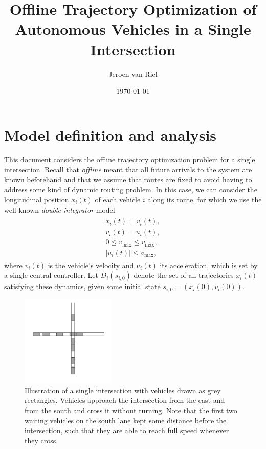 \documentclass[a4paper]{article}
\author{Jeroen van Riel}
\date{\monthyeardate\today}
\title{Offline Trajectory Optimization of Autonomous Vehicles in a Single Intersection}
\theoremstyle{definition}
\theoremstyle{plain}
\begin{document}
\maketitle

\tableofcontents


\section{Model definition and analysis}

This document considers the offline trajectory optimization problem for a single
intersection. Recall that \textit{offline} meant that all future arrivals to the
system are known beforehand and that we assume that routes are fixed to avoid
having to address some kind of dynamic routing problem.
In this case, we can consider the longitudinal
position $x_{i}(t)$ of each vehicle $i$ along its route, for which we use the
well-known \textit{double integrator} model
\begin{gather}
  \label{eq:vehicle_dynamics}
\begin{aligned}
  \dot{x}_{i}(t) = v_{i}(t) , \\
  \dot{v}_{i}(t) = u_{i}(t)  , \\
  0 \leq v_{\max} \leq v_{\max} , \\
  |u_{i}(t) | \leq a_{\max} ,
\end{aligned}
\end{gather}
where $v_{i}(t)$ is the vehicle's velocity and $u_{i}(t)$ its acceleration,
which is set by a single central controller. Let $D_{i}(s_{i,0})$ denote the set of all
trajectories $x_{i}(t)$ satisfying these
dynamics, given some initial state $s_{i,0} = (x_{i}(0), v_{i}(0))$.

\begin{figure}
  \centering
  \includegraphics[width=0.4\textwidth]{figures/single/single_intersection_example.png}
  \caption{Illustration of a single intersection with vehicles drawn as grey
    rectangles. Vehicles approach the intersection from the east and from the
    south and cross it without turning. Note that the first two waiting vehicles
    on the south lane kept some distance before the intersection, such that they
    are able to reach full speed whenever they
    cross.}\label{fig:intersection_illustration}
\end{figure}
\end{document}
